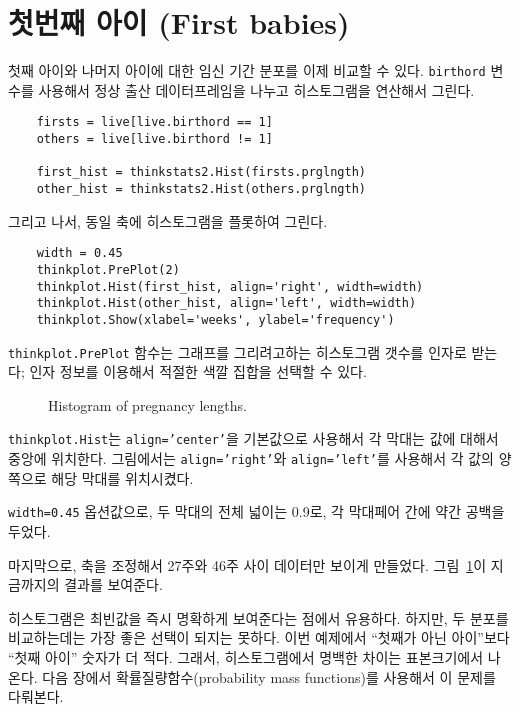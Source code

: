 \section{첫번째 아이 (First babies)}

첫째 아이와 나머지 아이에 대한 임신 기간 분포를 이제 비교할 수 있다.
{\tt birthord} 변수를 사용해서 정상 출산 데이터프레임을 나누고 히스토그램을 연산해서 그린다.


\begin{verbatim}
    firsts = live[live.birthord == 1]
    others = live[live.birthord != 1]

    first_hist = thinkstats2.Hist(firsts.prglngth)
    other_hist = thinkstats2.Hist(others.prglngth)
\end{verbatim}

그리고 나서, 동일 축에 히스토그램을 플롯하여 그린다.

\begin{verbatim}
    width = 0.45
    thinkplot.PrePlot(2)
    thinkplot.Hist(first_hist, align='right', width=width)
    thinkplot.Hist(other_hist, align='left', width=width)
    thinkplot.Show(xlabel='weeks', ylabel='frequency')
\end{verbatim}

{\tt thinkplot.PrePlot} 함수는 그래프를 그리려고하는 히스토그램 갯수를 인자로 받는다;
인자 정보를 이용해서 적절한 색깔 집합을 선택할 수 있다.


\begin{figure}
\caption{Histogram of pregnancy lengths.}
\label{first_nsfg_hist}
\end{figure}

{\tt thinkplot.Hist}는 {\tt align='center'}을 기본값으로 사용해서 
각 막대는 값에 대해서 중앙에 위치한다. 그림에서는 {\tt align='right'}와 {\tt align='left'}를
사용해서 각 값의 양쪽으로 해당 막대를 위치시켰다.

{\tt width=0.45} 옵션값으로, 두 막대의 전체 넓이는 0.9로, 각 막대페어 간에 약간 공백을 두었다.

마지막으로, 축을 조정해서 27주와 46주 사이 데이터만 보이게 만들었다. 
그림~\ref{first_nsfg_hist}이 지금까지의 결과를 보여준다.

히스토그램은 최빈값을 즉시 명확하게 보여준다는 점에서 유용하다.
하지만, 두 분포를 비교하는데는 가장 좋은 선택이 되지는 못하다. 
이번 예제에서 ``첫째가 아닌 아이''보다 ``첫째 아이'' 숫자가 더 적다. 
그래서, 히스토그램에서 명백한 차이는 표본크기에서 나온다. 다음 장에서 확률질량함수(probability mass functions)를 사용해서
이 문제를 다뤄본다. 


